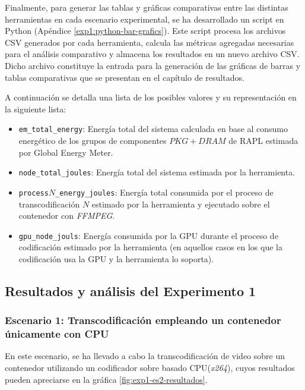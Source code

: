 Finalmente, para generar las tablas y gráficas comparativas entre las distintas herramientas en cada escenario experimental, se ha desarrollado un script en Python (Apéndice \ref{exp1:python-bar-grafics}). Este script procesa los archivos CSV generados por cada herramienta, calcula las métricas agregadas necesarias para el análisis comparativo y almacena los resultados en un nuevo archivo CSV. Dicho archivo constituye la entrada para la generación de las gráficas de barras y tablas comparativas que se presentan en el capítulo de resultados. 

A continuación se detalla una lista de los posibles valores y su representación en la siguiente lista:

\begin{itemize} 

 \item \texttt{em\_total\_energy}: Energía total del sistema calculada en base al consumo energético de los grupos de componentes $PKG+DRAM$ de RAPL estimada por Global Energy Meter. 

 \item \texttt{node\_total\_joules}: Energía total del sistema estimada por la herramienta.

 \item \texttt{process$N$\_energy\_joules}: Energía total consumida por el proceso de transcodificación $N$ estimado por la herramienta y ejecutado sobre el contenedor con \textit{FFMPEG}.  

 \item \texttt{gpu\_node\_jouls}: Energía consumida por la GPU durante el proceso de codificación estimado por la herramienta (en aquellos casos en los que la codificación usa la GPU y la herramienta lo soporta).

 \end{itemize}

\subsection{Resultados y análisis del Experimento 1}

\subsubsection{Escenario 1: Transcodificación empleando un contenedor únicamente con CPU}

 En este escenario, se ha llevado a cabo la transcodificación de video sobre un contenedor utilizando un codificador sobre basado CPU(\textit{x264}), cuyos resultados pueden apreciarse en la gráfica \ref{fig:exp1-es2-resultados}. 


